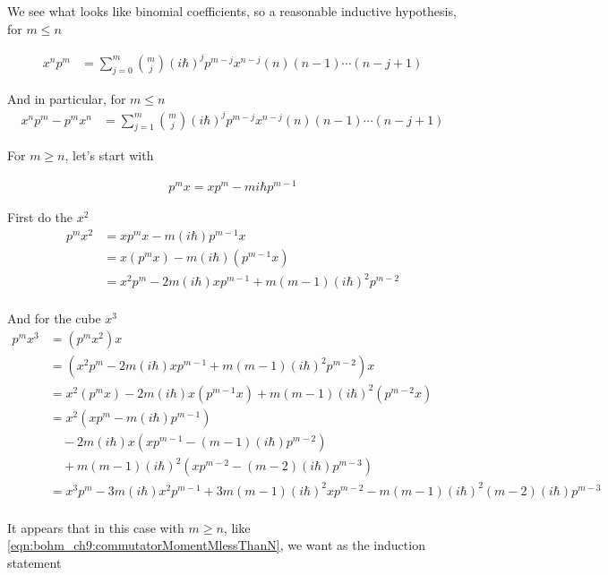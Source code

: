 We see what looks like binomial coefficients, so a reasonable inductive hypothesis, for $m \le n$

\begin{align}\label{eqn:bohm_ch9:commutatorMomentMlessThanN}
x^n p^m
&= \sum_{j=0}^m \binom{m}{j} (i \hbar)^j p^{m-j} x^{n-j} (n)(n-1)\cdots(n-j+1)
\end{align}

And in particular, for $m \le n$
\begin{align}
x^n p^m - p^m x^n
&= \sum_{j=1}^m \binom{m}{j} (i \hbar)^j p^{m-j} x^{n-j} (n)(n-1)\cdots(n-j+1) 
\end{align}

For $m \ge n$, let's start with

\begin{align*}
p^m x = x p^m -  m i \hbar p^{m-1} 
\end{align*}

First do the $x^2$
\begin{align*}
p^m x^2 
&= x p^m x -  m (i \hbar) p^{m-1} x \\
&= x (p^m x) -  m (i \hbar) (p^{m-1} x) \\
&= x^2 p^m - 2 m (i \hbar) x p^{m-1} +  m (m-1)(i \hbar)^2 p^{m-2} \\
\end{align*}

And for the cube $x^3$
\begin{align*}
p^m x^3  
&= 
( p^m x^2 ) x \\
&= 
( x^2 p^m - 2 m (i \hbar) x p^{m-1} +  m (m-1)(i \hbar)^2 p^{m-2} ) x \\
&= 
x^2 (p^m x )
- 2 m (i \hbar) x (p^{m-1} x )
+ m (m-1)(i \hbar)^2 (p^{m-2} x) \\
&= 
x^2 ( x p^m -  m (i \hbar) p^{m-1} ) \\
&\quad- 2 m (i \hbar) x ( x p^{m-1} -  (m-1) (i \hbar) p^{m-2} ) \\
&\quad+ m (m-1)(i \hbar)^2 ( x p^{m-2} -  (m-2) (i \hbar) p^{m-3} ) \\
&= 
x^3 p^m 
- 3 m (i \hbar) x^2 p^{m-1} 
+ 3 m (m-1) (i \hbar)^2 x p^{m-2} 
- m (m-1)(i \hbar)^2 (m-2) (i \hbar) p^{m-3} \\
\end{align*}

It appears that in this case with $m \ge n$, like \ref{eqn:bohm_ch9:commutatorMomentMlessThanN}, we want as the induction statement 

